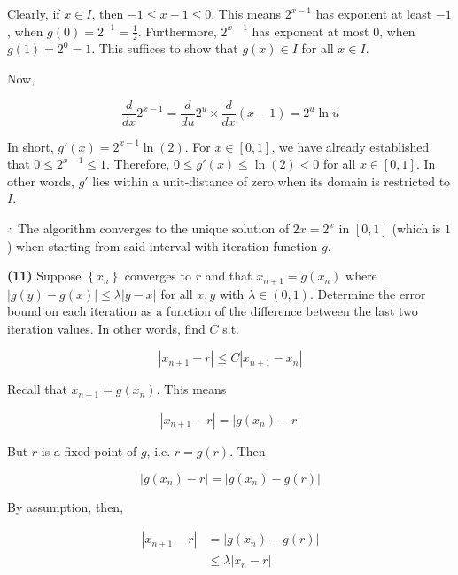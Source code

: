 \documentclass[12pt]{article}
\theoremstyle{definition}
\begin{document}
Clearly, if $x \in I$, then $-1 \leq x - 1 \leq 0$. This means 
$2^{x-1}$ has exponent at least $-1$, when $g(0) = 2^{-1} = \frac{1}{2}$.
Furthermore, $2^{x-1}$ has exponent at most $0$, when $g(1) = 2^{0} = 1$. This
suffices to show that $g(x) \in I$ for all $x \in I$.

Now, 

\begin{equation*}
    \frac{d}{dx}2^{x-1} = \frac{d}{du} 2^u \times \frac{d}{dx}(x-1) = 2^u \ln u
\end{equation*}

In short, $g'(x) = 2^{x-1} \ln(2)$. For $x \in [0, 1]$, we have already
established that $0 \leq 2^{x-1} \leq 1$. Therefore, $0 \leq g'(x) \leq \ln(2) <
0$ for all $x \in [0,1]$. In other words, $g'$ lies within a unit-distance of
zero when its domain is restricted to $I$.

$\therefore $ The algorithm converges to the unique solution of $2x = 2^{x}$ in
$[0, 1]$ (which is $1$) when starting from said interval with iteration function
$g$.

\pagebreak

\begin{shaded}
    \textbf{(11)} Suppose $\left\{ x_n \right\} $ converges to $r$ and that $x_{n+1} = g
    (x_n)$ where $|g(y) - g(x)| \leq \lambda|y - x|$ for all $x, y$ with
    $\lambda \in (0, 1)$. Determine the error bound on each iteration as a
    function of the difference between the last two iteration values. In other
    words, find $C$ s.t. 

    \begin{equation*}
        \left| x_{n+1} - r \right| \leq C \left| x_{n+1} - x_n \right| 
    \end{equation*}
\end{shaded}

Recall that $x_{n+1} = g(x_n)$. This means 

\begin{equation*}
    \left| x_{n+1} - r \right| = \left| g(x_n) - r \right| 
\end{equation*}

But $r$ is a fixed-point of $g$, i.e. $r = g(r)$. Then 

\begin{equation*}
    \left| g(x_n) - r \right| = \left| g(x_n) - g(r) \right| 
\end{equation*}

By assumption, then, 

\begin{align*}
    \left| x_{n+1} - r \right| 
    &= \left| g(x_n) - g(r) \right| \\ 
    &\leq \lambda\left| x_n - r \right| 
\end{align*}
\end{document}
